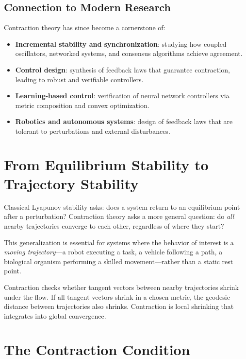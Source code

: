 \subsection{Connection to Modern Research}

Contraction theory has since become a cornerstone of:
\begin{itemize}
\item \textbf{Incremental stability and synchronization}: studying how coupled oscillators,
      networked systems, and consensus algorithms achieve agreement.
\item \textbf{Control design}: synthesis of feedback laws that guarantee contraction, leading
      to robust and verifiable controllers.
\item \textbf{Learning-based control}: verification of neural network controllers via metric
      composition and convex optimization.
\item \textbf{Robotics and autonomous systems}: design of feedback laws that are tolerant to
      perturbations and external disturbances.
\end{itemize}


\section{From Equilibrium Stability to Trajectory Stability}

Classical Lyapunov stability asks: does a system return to an equilibrium point after
a perturbation? Contraction theory asks a more general question: do \emph{all} nearby
trajectories converge to each other, regardless of where they start?

This generalization is essential for systems where the behavior of interest is a
\emph{moving trajectory}---a robot executing a task, a vehicle following a path, a
biological organism performing a skilled movement---rather than a static rest point.

\begin{intuitionbox}
Contraction checks whether tangent vectors between nearby trajectories shrink under the
flow. If all tangent vectors shrink in a chosen metric, the geodesic distance between
trajectories also shrinks. Contraction is local shrinking that integrates into global
convergence.
\end{intuitionbox}


\section{The Contraction Condition}

